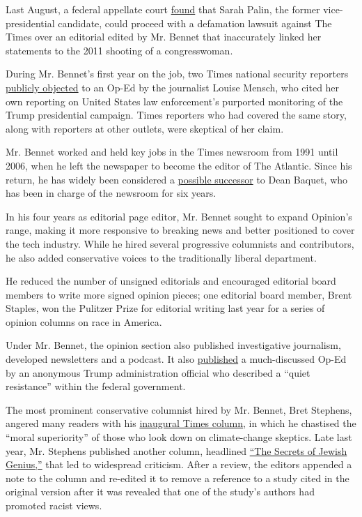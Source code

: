 Last August, a federal appellate court
\href{https://www.nytimes3xbfgragh.onion/2019/08/06/business/sarah-palin-lawsuit-new-york-times.html}{found}
that Sarah Palin, the former vice-presidential candidate, could proceed
with a defamation lawsuit against The Times over an editorial edited by
Mr. Bennet that inaccurately linked her statements to the 2011 shooting
of a congresswoman.

During Mr. Bennet's first year on the job, two Times national security
reporters
\href{https://www.buzzfeednews.com/article/stevenperlberg/russia-critic-sparks-feud-at-the-new-york-times}{publicly
objected} to an Op-Ed by the journalist Louise Mensch, who cited her own
reporting on United States law enforcement's purported monitoring of the
Trump presidential campaign. Times reporters who had covered the same
story, along with reporters at other outlets, were skeptical of her
claim.

Mr. Bennet worked and held key jobs in the Times newsroom from 1991
until 2006, when he left the newspaper to become the editor of The
Atlantic. Since his return, he has widely been considered a
\href{https://www.nytimes3xbfgragh.onion/2020/06/07/business/media/james-bennet-resigns-nytimes-op-ed.html}{possible
successor} to Dean Baquet, who has been in charge of the newsroom for
six years.

In his four years as editorial page editor, Mr. Bennet sought to expand
Opinion's range, making it more responsive to breaking news and better
positioned to cover the tech industry. While he hired several
progressive columnists and contributors, he also added conservative
voices to the traditionally liberal department.

He reduced the number of unsigned editorials and encouraged editorial
board members to write more signed opinion pieces; one editorial board
member, Brent Staples, won the Pulitzer Prize for editorial writing last
year for a series of opinion columns on race in America.

Under Mr. Bennet, the opinion section also published investigative
journalism, developed newsletters and a podcast. It also
\href{https://www.nytimes3xbfgragh.onion/2018/09/05/business/media/new-york-times-trump-anonymous.html}{published}
a much-discussed Op-Ed by an anonymous Trump administration official who
described a ``quiet resistance'' within the federal government.

The most prominent conservative columnist hired by Mr. Bennet, Bret
Stephens, angered many readers with his
\href{https://www.nytimes3xbfgragh.onion/2017/04/28/opinion/climate-of-complete-certainty.html}{inaugural
Times column}, in which he chastised the ``moral superiority'' of those
who look down on climate-change skeptics. Late last year, Mr. Stephens
published another column, headlined
\href{https://www.nytimes3xbfgragh.onion/2019/12/27/opinion/jewish-culture-genius-iq.html}{``The
Secrets of Jewish Genius,''} that led to widespread criticism. After a
review, the editors appended a note to the column and re-edited it to
remove a reference to a study cited in the original version after it was
revealed that one of the study's authors had promoted racist views.

